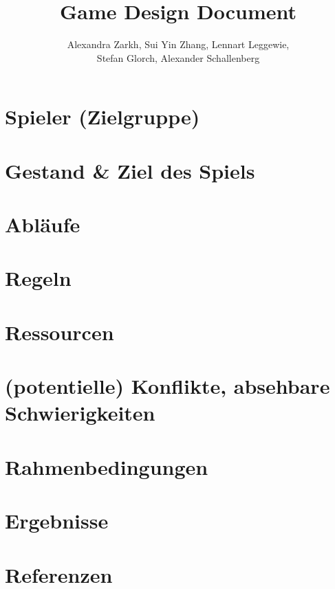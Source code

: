 \documentclass[11pt,a4paper]{article}
\title{\Huge\textbf{Game Design Document}}
\author{Alexandra Zarkh, Sui Yin Zhang, Lennart Leggewie,\\ Stefan Glorch, Alexander Schallenberg}
\begin{document}
\begin{titlepage}
	\maketitle
\end{titlepage}


\tableofcontents
\pagebreak

\section{Spieler (Zielgruppe)}

\section{Gestand \& Ziel des Spiels}

\section{Abläufe}

\section{Regeln}

\section{Ressourcen}

\section{(potentielle) Konflikte, absehbare Schwierigkeiten}

\section{Rahmenbedingungen}

\section{Ergebnisse}

\section{Referenzen}
\end{document}
